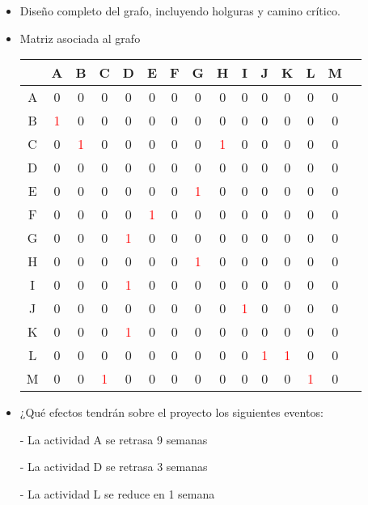 \documentclass[12pt]{article}
\begin{document}
\begin{itemize}
    \item Diseño completo del grafo, incluyendo holguras y camino crítico.

    \item Matriz asociada al grafo
    
    \begin{center}
    \begin{tabular}{c|cccccccccccccc}
          & A & B & C & D & E & F & G & H & I & J & K & L & M \\
      \hline
        A   & 0 & 0 & 0 & 0 & 0 & 0 & 0 & 0 & 0 & 0 & 0 & 0 & 0 \\
        B   & \textcolor{red}{1} & 0 & 0 & 0 & 0 & 0 & 0 & 0 & 0 & 0 & 0 & 0 & 0 \\
        C   & 0 & \textcolor{red}{1} & 0 & 0 & 0 & 0 & 0 & \textcolor{red}{1}& 0 & 0 & 0 & 0 & 0 \\
        D   & 0 & 0 & 0 & 0& 0& 0& 0& 0& 0& 0& 0& 0& 0 \\
        E   & 0 & 0 & 0 & 0& 0& 0& \textcolor{red}{1}& 0& 0& 0& 0& 0& 0 \\
        F   & 0 & 0 & 0 & 0& \textcolor{red}{1}& 0& 0& 0& 0& 0& 0& 0& 0 \\
        G   & 0 & 0 & 0 & \textcolor{red}{1}& 0& 0& 0& 0& 0& 0& 0& 0& 0 \\
        H   & 0 & 0 & 0 & 0& 0& 0& \textcolor{red}{1}& 0& 0& 0& 0& 0& 0 \\
        I   & 0 & 0 & 0 & \textcolor{red}{1}& 0& 0& 0& 0& 0& 0& 0& 0& 0 \\
        J   & 0 & 0 & 0 & 0& 0& 0& 0& 0& \textcolor{red}{1}& 0& 0& 0& 0 \\
        K   & 0 & 0 & 0 & \textcolor{red}{1}& 0& 0& 0& 0& 0& 0& 0& 0& 0 \\
        L   & 0 & 0 & 0 & 0& 0& 0& 0& 0& 0& \textcolor{red}{1}& \textcolor{red}{1}& 0& 0 \\
        M   & 0 & 0 & \textcolor{red}{1} & 0& 0& 0& 0& 0& 0& 0& 0& \textcolor{red}{1}& 0 \\
    \end{tabular}
  \end{center}

    \item ¿Qué efectos tendrán sobre el proyecto los siguientes eventos:


    
    - La actividad A se retrasa 9 semanas

    - La actividad D se retrasa 3 semanas

    - La actividad L se reduce en 1 semana

\end{itemize}
\end{document}
